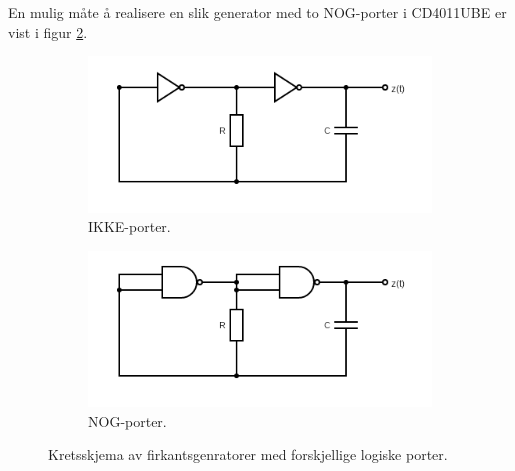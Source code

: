 \documentclass[a4paper,11pt,norsk]{article}
\begin{document}
En mulig måte å realisere en slik generator med to NOG-porter i CD4011UBE er vist i figur \ref{fig:firkantgenerator2}. 
\begin{figure}[H]
\centering
    \begin{subfigure}{0.5\linewidth}
\includegraphics[width=\linewidth]{D1/Images/firkantgenerator1.png} 
    \caption{IKKE-porter.}
\label{fig:firkantgenerator1}
    \end{subfigure}\hfill
    \begin{subfigure}{0.5\linewidth}
\includegraphics[width=\linewidth]{D1/Images/firkantgenerator2.png}
    \caption{NOG-porter.}
\label{fig:firkantgenerator2}
    \end{subfigure}
\caption{Kretsskjema av firkantsgenratorer med forskjellige logiske porter.}
    \label{fig:firkantgenerator}
\end{figure}
\end{document}
